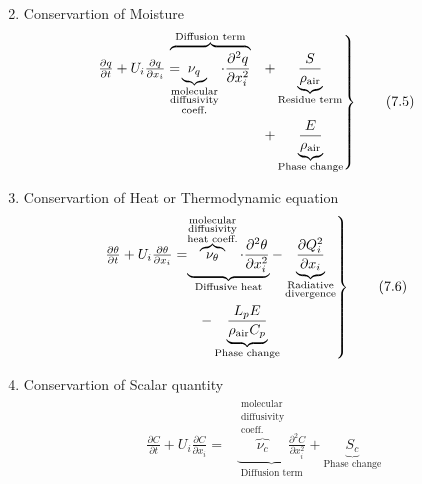 \documentclass[fleqn,10pt]{SelfArx} %
\begin{document}
\begin{enumerate}[noitemsep]
\begin{align*}
	      \end{align*}
	\item Conservartion of Moisture
	      \begin{align*}
		      \begin{rcases}
			    \mspace{-20mu} \frac{\partial q}{\partial t} + U_i\frac{\partial q}{\partial x_i} = \!\!\!\!\!\! \overbrace{\underbrace{\nu_q}_{\substack{\text{molecular} \\ \text{diffusivity} \\ \text{coeff.}}} \cdot \frac{\partial^2 q}{\partial x_i^2}}^{\text{Diffusion term}} &+ \underbrace{\frac{S}{\rho_{\text{air}}}}_{\text{Residue term}} \\ &+ \underbrace{\frac{E}{\rho_{\text{air}}}}_{\text{Phase change}}
		      \end{rcases} \tag{7.5} \label{eq:moistureeq}
	      \end{align*}
	\item Conservartion of Heat or Thermodynamic equation
	      \begin{align*}
		      \begin{rcases}
			    \mspace{-20mu} \frac{\partial \theta}{\partial t} + U_i\frac{\partial \theta}{\partial x_i} = &  \!\!\!\!\!\!\underbrace{\overbrace{\nu_\theta}^{\substack{\text{molecular} \\ \text{diffusivity} \\ \text{heat coeff.}}} \cdot \frac{\partial^2 \theta}{\partial x_i^2}}_{\text{Diffusive heat}} - \underbrace{\frac{\partial Q_i^2}{\partial x_i}}_{\substack{\text{Radiative} \\ \text{divergence}}} \\ &- \underbrace{\frac{L_pE}{\rho_{\text{air}}C_p}}_{\text{Phase change}}
		      \end{rcases} \tag{7.6} \label{eq:heateq}
	      \end{align*}
	\item Conservartion of Scalar quantity
	      \begin{align*}
		      \frac{\partial C}{\partial t} + U_i\frac{\partial C}{\partial x_i} = & \underbrace{\overbrace{\nu_c}^{\substack{\text{molecular} \\ \text{diffusivity} \\ \text{coeff.}}} \frac{\partial^2 C}{\partial x_i^2}}_{\text{Diffusion term}} + \underbrace{S_c}_{\text{Phase change}} \tag{7.7} \label{eq:scalarquantity}
	      \end{align*}
\end{enumerate}
\end{document}
